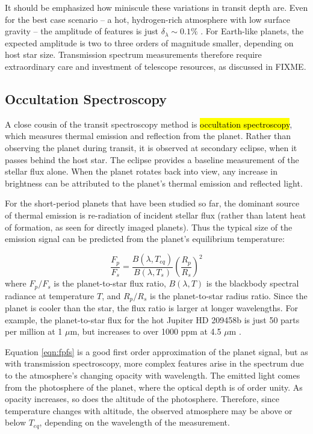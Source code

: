 \documentclass[graybox,natbib,nosecnum]{svmult}
\newcommand{\hbindex}[1]{\hl{#1}\index{#1}}  %
\begin{document}
It should be emphasized how miniscule these variations in transit depth are. Even for the best case scenario -- a hot, hydrogen-rich atmosphere with low surface gravity -- the amplitude of features is just $\delta_\lambda \sim0.1\%$ \citep[e.g. WASP 121-b;][]{evans16}. For Earth-like planets, the expected amplitude is two to three orders of magnitude smaller, depending on host star size. Transmission spectrum measurements therefore require extraordinary care and investment of telescope resources, as discussed in FIXME.

\subsection{Occultation Spectroscopy}
A close cousin of the transit spectroscopy method is \hbindex{occultation spectroscopy}, which measures thermal emission and reflection from the planet. Rather than observing the planet during transit, it is observed at secondary eclipse, when it passes behind the host star. The eclipse provides a baseline measurement of the stellar flux alone. When the planet rotates back into view, any increase in brightness can be attributed to the planet's thermal emission and reflected light.

For the short-period planets that have been studied so far, the dominant source of thermal emission is re-radiation of incident stellar flux (rather than latent heat of formation, as seen for directly imaged planets). Thus the typical size of the emission signal can be predicted from the planet's equilibrium temperature:

\begin{equation}
\label{eqn:fpfs}
\frac{F_p}{F_s} = \frac{B(\lambda, T_{eq})}{B(\lambda, T_s)}\left(\frac{R_p}{R_s}\right)^2
\end{equation}
where $F_p/F_s$ is the planet-to-star flux ratio, $B(\lambda, T)$ is the blackbody spectral radiance at temperature $T$, and $R_p/R_s$ is the planet-to-star radius ratio. Since the planet is cooler than the star, the flux ratio is larger at longer wavelengths. For example, the planet-to-star flux for the hot Jupiter HD 209458b is just 50 parts per million at 1 $\mu$m, but increases to over 1000 ppm at 4.5 $\mu$m \citep{line16}.

Equation \ref{eqn:fpfs} is a good first order approximation of the planet signal, but as with transmission spectroscopy, more complex features arise in the spectrum due to the atmosphere's changing opacity with wavelength. The emitted light comes from the photosphere of the planet, where the optical depth is of order unity.  As opacity increases, so does the altitude of the photosphere.  Therefore, since temperature changes with altitude, the observed atmosphere may be above or below $T_{eq}$, depending on the wavelength of the measurement. 
\end{document}
